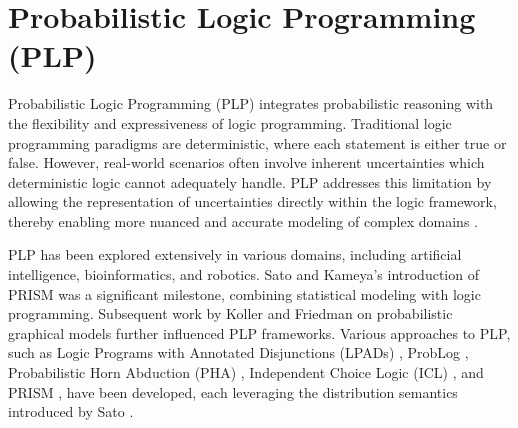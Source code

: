 














\section{Probabilistic Logic Programming (PLP)}

Probabilistic Logic Programming (PLP) integrates probabilistic reasoning with the flexibility and expressiveness of logic programming. Traditional logic programming paradigms are deterministic, where each statement is either true or false. However, real-world scenarios often involve inherent uncertainties which deterministic logic cannot adequately handle. PLP addresses this limitation by allowing the representation of uncertainties directly within the logic framework, thereby enabling more nuanced and accurate modeling of complex domains \cite{Sato2001, Kimmig2011}.

PLP has been explored extensively in various domains, including artificial intelligence, bioinformatics, and robotics. Sato and Kameya's introduction of PRISM \cite{Sato1997} was a significant milestone, combining statistical modeling with logic programming. Subsequent work by Koller and Friedman \cite{Koller2009} on probabilistic graphical models further influenced PLP frameworks. Various approaches to PLP, such as Logic Programs with Annotated Disjunctions (LPADs) \cite{Vennekens2004}, ProbLog \cite{DeRaedt2007}, Probabilistic Horn Abduction (PHA) \cite{Poole1993}, Independent Choice Logic (ICL) \cite{Poole1997}, and PRISM \cite{Sato2001}, have been developed, each leveraging the distribution semantics introduced by Sato \cite{Sato2001}.

